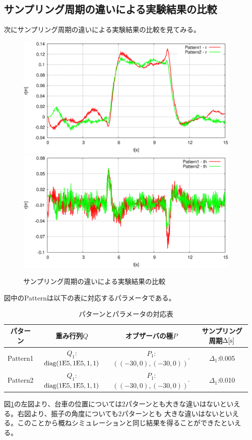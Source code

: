 	\subsection{サンプリング周期の違いによる実験結果の比較}
	次にサンプリング周期の違いによる実験結果の比較を見てみる。
	\begin{figure}[H]
		\centering
		\includegraphics[width=0.49\linewidth]{gazo/Compare_dt_R2.eps}
		\includegraphics[width=0.49\linewidth]{gazo/Compare_dt_TH2.eps}
		\caption{サンプリング周期の違いによる実験結果の比較}
		\label{image:comp_dt}
	\end{figure}
	図中のPatternは以下の表に対応するパラメータである。
	\begin{table}[H]
		\begin{center}
			\caption{パターンとパラメータの対応表}
			\medskip
			
			\begin{tabular}{|c|c|c|c|}\hline
				パターン & 重み行列$Q$ & オブザーバの極$P$ & サンプリング周期$\Delta[\rm{s}]$ \\ \hline\hline
				Pattern1 & $Q_1$:$\rm{diag}(1E5,1E5,1,1)$ & $P_1$:$((-30,0),(-30,0))^{'}$ & $\Delta_1$:0.005 \\ \hline
				Pattern2 & $Q_1$:$\rm{diag}(1E5,1E5,1,1)$ & $P_1$:$((-30,0),(-30,0))^{'}$ & $\Delta_1$:0.010 \\ \hline
			\end{tabular}
		\end{center}
		\label{table:huriage_control}
	\end{table}
	図\ref{image:comp_dt}の左図より、台車の位置については2パターンとも大きな違いはないといえる。右図より、振子の角度についても2パターンとも
	大きな違いはないといえる。このことから概ねシミュレーションと同じ結果を得ることができたといえる。
	\newpage
